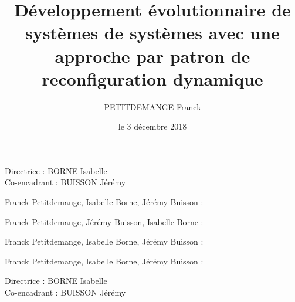 \documentclass{beamer}
\title{Développement évolutionnaire de systèmes de systèmes avec une approche par patron de reconfiguration dynamique}
\author{PETITDEMANGE Franck}
\institute{\texttt{[image: logo\_irisa.jpg]}\texttt{[image: logo\_ubs.jpeg]}}
\date{le 3 décembre 2018}
\begin{document}
\captionsetup[figure]{labelformat=empty}

\begin{frame}[plain]
\titlepage
\begin{center}
Directrice : BORNE Isabelle\\
Co-encadrant : BUISSON Jérémy  
\end{center}

\end{frame}


%







\begin{frame}[plain]
\begin{thebibliography}{}
\bibitem{}
Franck Petitdemange, Isabelle Borne, Jérémy Buisson :

\bibitem{}
Franck Petitdemange, Jérémy Buisson, Isabelle Borne :

\bibitem{}
Franck Petitdemange, Isabelle Borne, Jérémy Buisson :

\bibitem{}
Franck Petitdemange, Isabelle Borne, Jérémy Buisson :
\end{thebibliography}
\end{frame}


\begin{frame}[plain]
\titlepage
\begin{center}
Directrice : BORNE Isabelle\\
Co-encadrant : BUISSON Jérémy  
\end{center}

\end{frame}
\end{document}
